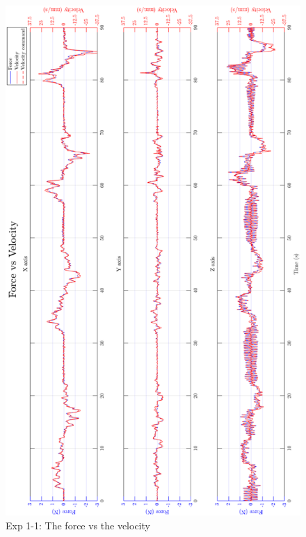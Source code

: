 \begin{figure}[htbp]
\begin{center}
\includegraphics[width=0.9\linewidth]{Images/exp/exp1_1_2.png}
\caption{Exp 1-1: The force vs the velocity}
\label{fig: exp1_1_2}
\end{center}
\end{figure}

